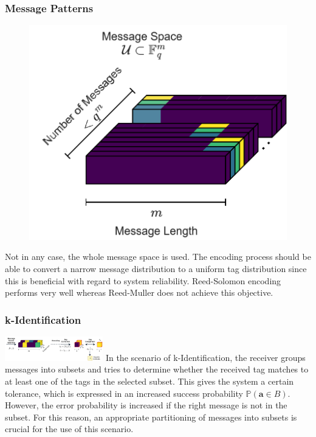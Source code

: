 \documentclass[%
  english,%
  paper=A1,%
  fontsize=22pt,%
  cdfoot=5ex,%
  ddcfoot,%
  BCOR=-20mm,
]{tudscrposter}
\begin{document}
\begin{multicols}{3}
\subsubsection*{Message Patterns}
\begin{figure}
    \centering
    \includegraphics{figures/ID_flow-Message Patterns.pdf}
\end{figure}
Not in any case, the whole message space is used. The encoding process should be able to convert a narrow message distribution to a uniform tag distribution since this is beneficial with regard to system reliability. Reed-Solomon encoding performs very well whereas Reed-Muller does not achieve this objective.

\subsubsection*{k-Identification}
\includegraphics[width=0.32\textwidth]{figures/ID_flow-k-ID.drawio.pdf}
In the scenario of k-Identification, the receiver groups messages into subsets and tries to determine whether the received tag matches to at least one of the tags in the selected subset. This gives the system a certain tolerance, which is expressed in an increased success probability $ \mathbb{P}(\boldsymbol{a} \in B)$. However, the error probability is increased if the right message is not in the subset. For this reason, an appropriate partitioning of messages into subsets is crucial for the use of this scenario.


\end{multicols}
\end{document}
